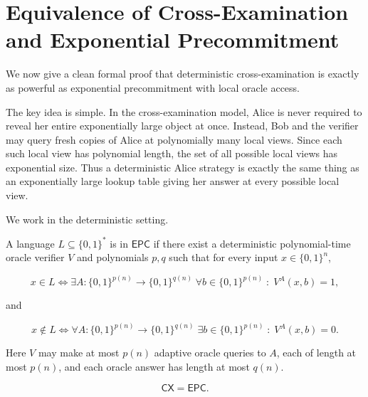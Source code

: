 \documentclass[11pt]{article}
\begin{document}

\section{Equivalence of Cross-Examination and Exponential Precommitment}

We now give a clean formal proof that deterministic cross-examination is exactly as powerful as exponential precommitment with local oracle access.

\medskip

The key idea is simple. In the cross-examination model, Alice is never required to reveal her entire exponentially large object at once. Instead, Bob and the verifier may query fresh copies of Alice at polynomially many local views. Since each such local view has polynomial length, the set of all possible local views has exponential size. Thus a deterministic Alice strategy is exactly the same thing as an exponentially large lookup table giving her answer at every possible local view.

\medskip

We work in the deterministic setting.

\begin{definition}
A language \(L \subseteq \{0,1\}^*\) is in \(\mathsf{EPC}\) if there exist a deterministic polynomial-time oracle verifier \(V\) and polynomials \(p,q\) such that for every input \(x \in \{0,1\}^n\),

\[
x \in L
\iff
\exists A : \{0,1\}^{p(n)} \to \{0,1\}^{q(n)}
\;\forall b \in \{0,1\}^{p(n)}\;:\;
V^A(x,b)=1,
\]

and

\[
x \notin L
\iff
\forall A : \{0,1\}^{p(n)} \to \{0,1\}^{q(n)}
\;\exists b \in \{0,1\}^{p(n)}\;:\;
V^A(x,b)=0.
\]

Here \(V\) may make at most \(p(n)\) adaptive oracle queries to \(A\), each of length at most \(p(n)\), and each oracle answer has length at most \(q(n)\).
\end{definition}


\begin{theorem}
\[
\mathsf{CX} = \mathsf{EPC}.
\]
\end{theorem}
\end{document}
